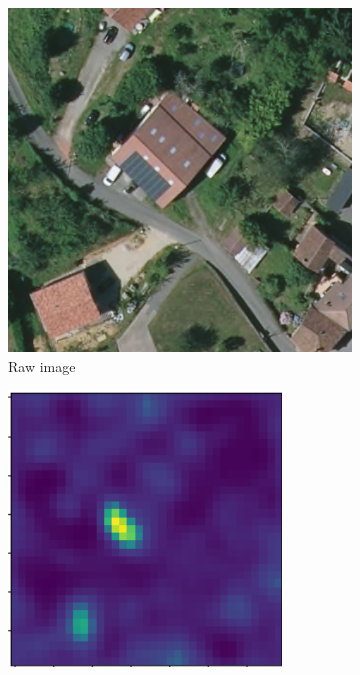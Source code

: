 \documentclass[10pt,twocolumn,letterpaper]{article}
\begin{document}
\begin{figure}[htp]
\centering
\begin{subfigure}{.3\textwidth}
    \centering
    \includegraphics[width=.95\linewidth]{example.png}  
    \caption{Raw image}
\end{subfigure}
\begin{subfigure}{.3\textwidth}
    \centering
    \includegraphics[width=.95\linewidth]{example_cam_seg.png}  

\end{subfigure}
\end{figure}
\end{document}
